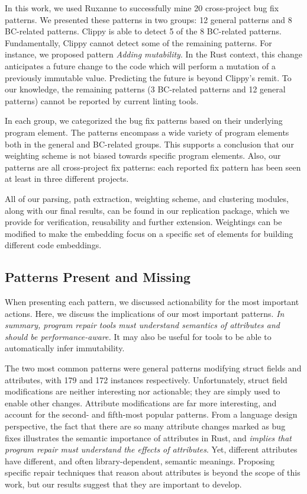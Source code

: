 In this work, we used Ruxanne to successfully mine 20 cross-project bug fix patterns. We presented these patterns in two groups: 12 general patterns and 8 BC-related patterns. Clippy is able to detect 5 of the 8 BC-related patterns. Fundamentally, Clippy cannot detect some of the remaining patterns. For instance, we proposed pattern \textit{Adding mutability}. In the Rust context, this change anticipates a future change to the code which will perform a mutation of a previously immutable value. Predicting the future is beyond Clippy's remit. To our knowledge, the remaining patterns (3 BC-related patterns and 12 general patterns) cannot be reported by current linting tools. 

In each group, we categorized the bug fix patterns based on their underlying program element. The patterns encompass a wide variety of program elements both in the general and BC-related groups. This supports a conclusion that our weighting scheme is not biased towards specific program elements. Also, our patterns are all cross-project fix patterns: each reported fix pattern has been seen at least in three different projects.

All of our parsing, path extraction, weighting scheme, and clustering modules, along with our final results, can be found in our replication package, which we provide for verification, reusability and further extension. Weightings can be modified to make the embedding focus on a specific set of elements for building different code embeddings.

\subsection{Patterns Present and Missing}
\label{subsec:patterns}

When presenting each pattern, we discussed actionability for the most important actions. Here, we discuss the implications of our most important patterns. \emph{In summary, program repair tools must understand semantics of attributes and should be performance-aware.} It may also be useful for tools to be able to automatically infer immutability.

The two most common patterns were general patterns modifying struct fields and attributes, with 179 and 172  instances respectively. Unfortunately, struct field modifications are neither interesting nor actionable; they are simply used to enable other changes. Attribute modifications are far more interesting, and account for the second- and fifth-most popular patterns. From a language design perspective, the fact that there are so many attribute changes marked as bug fixes illustrates the semantic importance of attributes in Rust, and \emph{implies that program repair must understand the effects of attributes}. Yet, different attributes have different, and often library-dependent, semantic meanings. Proposing specific repair techniques that reason about attributes is beyond the scope of this work, but our results suggest that they are important to develop.

